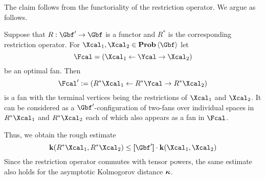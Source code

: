 \begin{Proof}
  The claim  follows from the functoriality of the restriction
  operator. We argue as follows.

  Suppose that $R:\Gbf'\to\Gbf$ is a functor and $R^{*}$ is the
  corresponding restriction operator. For
  $\Xcal_{1},\Xcal_{2}\in\prob\<\Gbf>$ let
  \[
  \Fcal=(\Xcal_{1}\ot\Ycal\to\Xcal_{2})
  \]
  be an optimal fan. Then
  \[
  \Fcal':=(R^{*}\Xcal_{1}\ot R^{*}\Ycal\to R^{*}\Xcal_{2})
  \]
  is a fan with the terminal vertices being the restrictions of
  $\Xcal_{1}$ and $\Xcal_{2}$. It can be considered as a
  $\Gbf'$-configuration of two-fans over individual spaces in
  $R^{*}\Xcal_{1}$ and $R^{*}\Xcal_{2}$ each of which also appears as
  a fan in $\Fcal$. 
  
  Thus, we obtain the rough estimate
  \[
  \ikd(R^{*}\Xcal_{1},R^{*}\Xcal_{2})
  \leq
  \size{\Gbf'}\cdot\ikd(\Xcal_{1},\Xcal_{2})
  \]
  Since the restriction operator commutes with tensor powers, the same
  estimate also holds for the asymptotic Kolmogorov distance $\operatorname{{\bm\kappa}}$.
\end{Proof}


